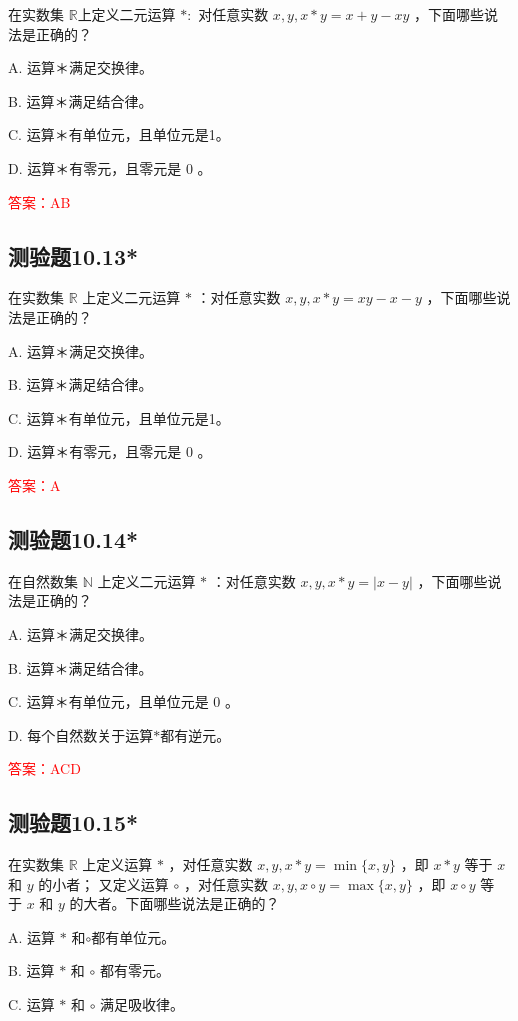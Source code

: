 \documentclass[UTF8, heading=true]{ctexart}
\begin{document}
在实数集 $\mathbb{R}$上定义二元运算 $*:$ 对任意实数 $x, y, x * y=x+y-x y$ ，下面哪些说法是正确的？

A. 运算＊满足交换律。

B. 运算＊满足结合律。

C. 运算＊有单位元，且单位元是1。

D. 运算＊有零元，且零元是 0 。


\textcolor{red}{答案：AB}

\subsection{测验题10.13*}

在实数集 $\mathbb{R}$ 上定义二元运算 $*$ ：对任意实数 $x, y, x * y=x y-x-y$ ，下面哪些说法是正确的？

A. 运算＊满足交换律。

B. 运算＊满足结合律。

C. 运算＊有单位元，且单位元是1。

D. 运算＊有零元，且零元是 0 。

\textcolor{red}{答案：A}

\subsection{测验题10.14*}

在自然数集 $\mathbb{N} $ 上定义二元运算 $*$ ：对任意实数 $x, y, x * y=|x-y|$ ，下面哪些说法是正确的？

A. 运算＊满足交换律。

B. 运算＊满足结合律。

C. 运算＊有单位元，且单位元是 0 。

D. 每个自然数关于运算$*$都有逆元。

\textcolor{red}{答案：ACD}

\subsection{测验题10.15*}

在实数集 $\mathbb{R}$ 上定义运算 $*$ ，对任意实数 $x, y, x * y=\min \{x, y\}$ ，即 $x * y$ 等于 $x$ 和 $y$ 的小者；
又定义运算 $\circ$ ，对任意实数 $x, y, x \circ y=\max \{x, y\}$ ，即 $x \circ y$ 等
于 $x$ 和 $y$ 的大者。下面哪些说法是正确的？

A. 运算 $*$ 和$\circ$都有单位元。

B. 运算 $*$ 和 $\circ$ 都有零元。

C. 运算 $*$ 和 $\circ$ 满足吸收律。
\end{document}

